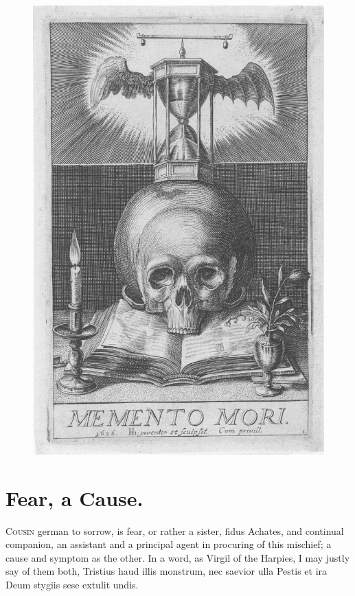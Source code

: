 {\begin{figure}[p]
  \centering
  \includegraphics[keepaspectratio,width=\textwidth]{figures/memento-mori-small.jpg}
  \caption{}
  \label{fig:mementomori}
\end{figure}

\section{Fear, a Cause.}

\lettrine{C}{ousin} german to sorrow, is fear, or rather a sister, fidus Achates,
and continual companion, an assistant and a principal agent in
procuring of this mischief; a cause and symptom as the other. In a
word, as  Virgil of the Harpies, I may justly say of them both,
Tristius haud illis monstrum, nec saevior ulla
Pestis et ira Deum stygiis sese extulit undis.

}
